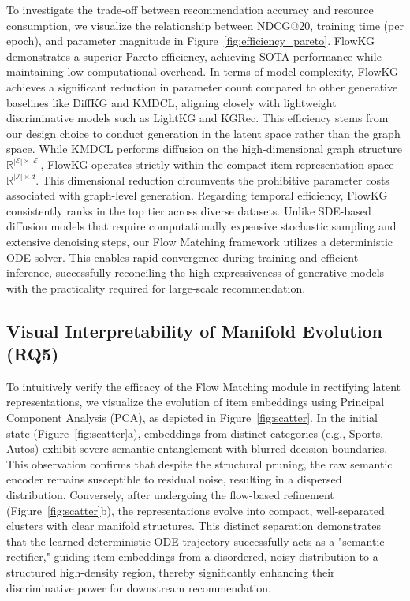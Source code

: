 To investigate the trade-off between recommendation accuracy and resource consumption, we visualize the relationship between NDCG@20, training time (per epoch), and parameter magnitude in Figure~\ref{fig:efficiency_pareto}.
FlowKG demonstrates a superior Pareto efficiency, achieving SOTA performance while maintaining low computational overhead.
In terms of model complexity, FlowKG achieves a significant reduction in parameter count compared to other generative baselines like DiffKG and KMDCL, aligning closely with lightweight discriminative models such as LightKG and KGRec.
This efficiency stems from our design choice to conduct generation in the latent space rather than the graph space.
While KMDCL performs diffusion on the high-dimensional graph structure $\mathbb{R}^{|\mathcal{E}| \times |\mathcal{E}|}$, FlowKG operates strictly within the compact item representation space $\mathbb{R}^{|\mathcal{I}| \times d}$.
This dimensional reduction circumvents the prohibitive parameter costs associated with graph-level generation.
Regarding temporal efficiency, FlowKG consistently ranks in the top tier across diverse datasets.
Unlike SDE-based diffusion models that require computationally expensive stochastic sampling and extensive denoising steps, our Flow Matching framework utilizes a deterministic ODE solver.
This enables rapid convergence during training and efficient inference, successfully reconciling the high expressiveness of generative models with the practicality required for large-scale recommendation.

\subsection{Visual Interpretability of Manifold Evolution (RQ5)}


To intuitively verify the efficacy of the Flow Matching module in rectifying latent representations, we visualize the evolution of item embeddings using Principal Component Analysis (PCA), as depicted in Figure~\ref{fig:scatter}. In the initial state (Figure~\ref{fig:scatter}a), embeddings from distinct categories (e.g., Sports, Autos) exhibit severe semantic entanglement with blurred decision boundaries. This observation confirms that despite the structural pruning, the raw semantic encoder remains susceptible to residual noise, resulting in a dispersed distribution. Conversely, after undergoing the flow-based refinement (Figure~\ref{fig:scatter}b), the representations evolve into compact, well-separated clusters with clear manifold structures. This distinct separation demonstrates that the learned deterministic ODE trajectory successfully acts as a "semantic rectifier," guiding item embeddings from a disordered, noisy distribution to a structured high-density region, thereby significantly enhancing their discriminative power for downstream recommendation.


